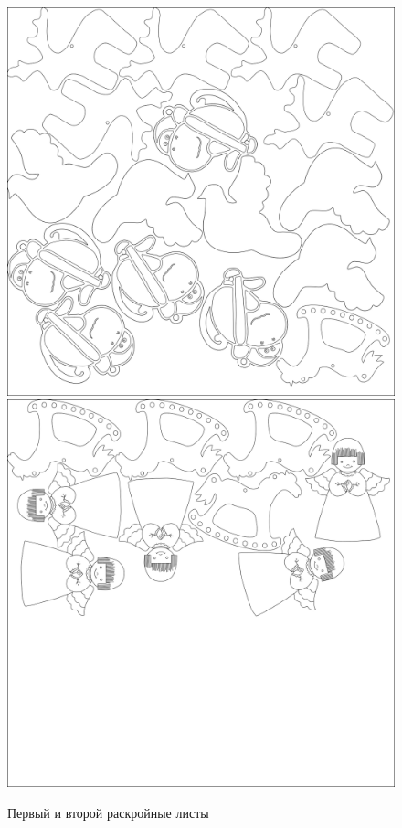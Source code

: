 \documentclass[14pt]{extarticle}
\begin{document}
	\begin{figure}[h]
		\centering
		\includegraphics[scale=0.18]{plane1}
		\includegraphics[scale=0.18]{plane2}
		\caption{Первый и второй раскройные листы}
		\label{plane12}
	\end{figure}
\end{document}
